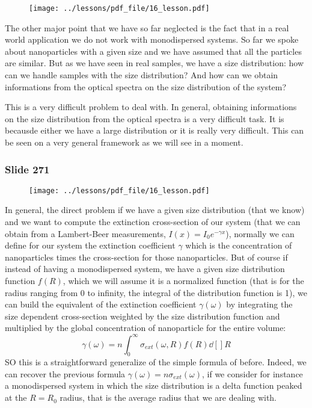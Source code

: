 \documentclass[../main/main.tex]{subfiles}
\begin{document}
\begin{figure}[h!]
\centering
\texttt{[image: ../lessons/pdf\_file/16\_lesson.pdf]}
\end{figure}

The other major point that we have so far neglected is the fact that in a real world application we do not work with monodispersed systems. So far we spoke about nanoparticles with a given size and we have assumed that all the particles are similar. But as we have seen in real samples, we have a size distribution: how can we handle samples with the size distribution? And how can we obtain informations from the optical spectra on the size distribution of the system?

This is a very difficult problem to deal with. In general, obtaining informations on the size distribution from the optical spectra is a very difficult task. It is becausde either we have a large distribution or it is really very difficult.
This can be seen on a very general framework as we will see in a moment.

\newpage

\subsubsection{Slide 271}

\begin{figure}[h!]
\centering
\texttt{[image: ../lessons/pdf\_file/16\_lesson.pdf]}
\end{figure}

In general, the direct problem if we have a given size distribution (that we know) and we want to compute the extinction cross-section of our system (that we can obtain from a Lambert-Beer measurements, \( I(x) = I_0 e^{- \gamma x }  \)), normally we can define for our system the extinction coefficient \( \gamma   \) which is the concentration of nanoparticles times the cross-section for those nanoparticles. But of course if instead of having a monodispersed system, we have a given size distribution function \( f(R) \), which we will assume it is a normalized function (that is for the radius ranging from 0 to infinity, the integral of the distribution function is 1), we can build the equivalent of the extinction coefficient \( \gamma (\omega )  \) by integrating the size dependent cross-section weighted by the size distribution function and multiplied by the global concentration of nanoparticle for the entire volume:
\begin{equation*}
  \gamma (\omega ) = n \int_{0 }^{\infty } \sigma _{ext} (\omega ,R) f(R)\dd[]{R}
\end{equation*}
SO this is a straightforward generalize of the simple formula of before. Indeed, we can recover the previous formula \( \gamma (\omega ) = n \sigma _{ext} (\omega )  \), if we consider for instance a monodispersed system in which the size distribution is a delta function peaked at the \( R=R_0 \) radius, that is the average radius that we are dealing with.
\end{document}
